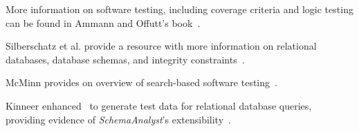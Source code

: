 



More information on software testing, including coverage criteria and logic testing can be found in Ammann and Offutt's
book~\cite{ammann2008}.

Silberschatz et al. provide a resource with more information on relational databases, database schemas, and integrity
constraints~\cite{databasebook}.

McMinn provides on overview of search-based software testing~\cite{STVR:STVR294}.

Kinneer enhanced \sa~to generate test data for relational database queries, providing evidence of
\textit{SchemaAnalyst}'s extensibility~\cite{kinneer2016comp}.
